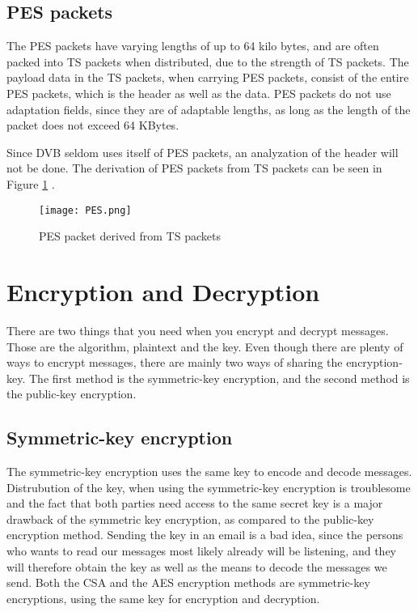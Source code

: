 \subsection{PES packets}
The PES packets have varying lengths of up to 64 kilo bytes, and are 
often packed into TS packets when distributed, due to the strength of 
TS packets. The payload data in the TS packets, when carrying PES 
packets, consist of the entire PES packets, which is the header as well 
as the data. PES packets do not use adaptation fields, since they are 
of adaptable lengths, as long as the length of the packet does not 
exceed 64 KBytes.

Since DVB seldom uses itself of PES packets, an analyzation of the 
header will not be done. The derivation of PES packets from TS packets 
can be seen in Figure \ref{img:PES} \citep[p. 9]{ETR:289}.

\begin{figure}
  \texttt{[image: PES.png]}
  \caption{PES packet derived from TS packets}
  \label{img:PES}
\end{figure}

\section{Encryption and Decryption}
There are two things that you need when you encrypt and decrypt 
messages. Those are the algorithm, plaintext and the key. Even though 
there are plenty of ways to encrypt messages, there are mainly two ways 
of sharing the encryption-key. The first method is the symmetric-key 
encryption, and the second method is the public-key encryption.

\subsection{Symmetric-key encryption}\label{ch:symmetric}
The symmetric-key encryption uses the same key to encode and decode 
messages. Distrubution of the key, when using the symmetric-key 
encryption is troublesome and the fact that both parties need access to 
the same secret key is a major drawback of the symmetric key 
encryption, as compared to the public-key encryption method. Sending 
the key in an email is a bad idea, since the persons who wants to read 
our messages most likely already will be listening, and they will 
therefore obtain the key as well as the means to decode the messages we 
send. Both the CSA and the AES encryption methods are symmetric-key 
encryptions, using the same key for encryption and decryption.

